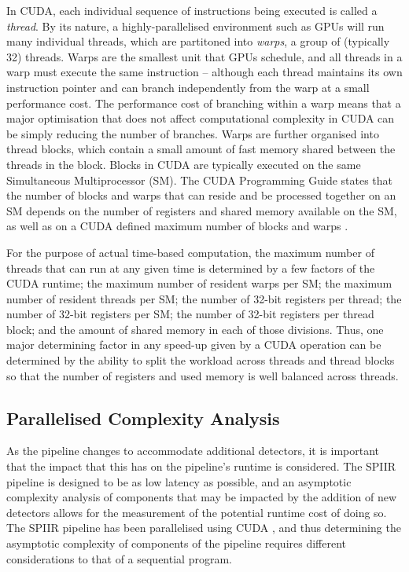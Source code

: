 \documentclass{article}
\begin{document}
In CUDA, each individual sequence of instructions being executed is called a \textit{thread}.
By its nature, a highly-parallelised environment such as GPUs will run many individual threads, which are partitoned into \textit{warps}, a group of (typically 32) threads.
Warps are the smallest unit that GPUs schedule, and all threads in a warp must execute the same instruction -- although each thread maintains its own instruction pointer and can branch independently from the warp at a small performance cost.
The performance cost of branching within a warp means that a major optimisation that does not affect computational complexity in CUDA can be simply reducing the number of branches.
Warps are further organised into thread blocks, which contain a small amount of fast memory shared between the threads in the block.
Blocks in CUDA are typically executed on the same Simultaneous Multiprocessor (SM).
The CUDA Programming Guide states that the number of blocks and warps that can reside and be processed together on an SM depends on the number of registers and shared memory available on the SM, as well as on a CUDA defined maximum number of blocks and warps \cite{CUDA_Guide}.

For the purpose of actual time-based computation, the maximum number of threads that can run at any given time is determined by a few factors of the CUDA runtime; the maximum number of resident warps per SM; the maximum number of resident threads per SM; the number of 32-bit registers per thread; the number of 32-bit registers per SM; the number of 32-bit registers per thread block; and the amount of shared memory in each of those divisions.
Thus, one major determining factor in any speed-up given by a CUDA operation can be determined by the ability to split the workload across threads and thread blocks so that the number of registers and used memory is well balanced across threads.

\subsection{Parallelised Complexity Analysis} \label{sec:lit_review:par_comp_analysis}

As the pipeline changes to accommodate additional detectors, it is important that the impact that this has on the pipeline's runtime is considered.
The SPIIR pipeline is designed to be as low latency as possible, and an asymptotic complexity analysis of components that may be impacted by the addition of new detectors allows for the measurement of the potential runtime cost of doing so.
The SPIIR pipeline has been parallelised using CUDA \cite{SPIIRGPU2018}, and thus determining the asymptotic complexity of components of the pipeline requires different considerations to that of a sequential program.
\\
\end{document}
